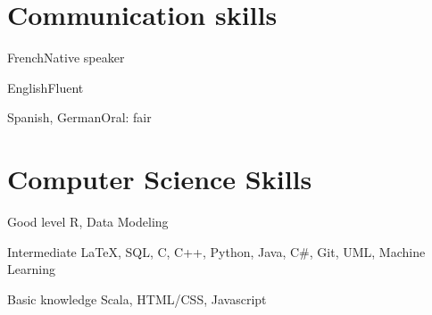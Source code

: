 \documentclass{tccv}
\begin{document}
\section{Communication skills}

\begin{factlist}
\item{French}{Native speaker}
\item{English}{Fluent}
\item{Spanish, German}{Oral: fair}
\end{factlist}

\section{Computer Science Skills}

\begin{factlist}

\item{Good level}
     {R, Data Modeling}
     
\item{Intermediate}
     {\LaTeX, SQL, C, C++, Python, Java, C\#, Git, UML, Machine Learning}
     
\item{Basic knowledge}
     {Scala, HTML/CSS, Javascript}

\end{factlist}
\end{document}
